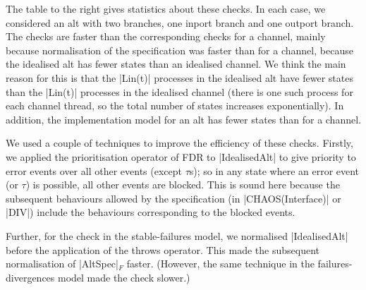 \begin{window}
%
The table to the right gives statistics about these checks.  In each case, we
considered an alt with two branches, one inport branch and one outport
branch.  The checks are faster than the corresponding checks for a channel,
mainly because normalisation of the specification was
faster than for a channel, because the idealised alt has fewer states than an
idealised channel.  We think the main reason for this is that the |Lin(t)|
processes in the idealised alt have fewer states than the |Lin(t)| processes
in the idealised channel (there is one such process for each channel thread,
so the total number of states increases exponentially).  In addition, the
implementation model for an alt has fewer states than for a channel.
\end{window}

We used a couple of techniques to improve the efficiency of these checks.
Firstly, we applied the prioritisation operator of FDR to |IdealisedAlt| to
give priority to error events over all other events (except $\tau$s); so in
any state where an error event (or $\tau$) is possible, all other events are
blocked.  This is sound here because the subsequent behaviours allowed by the
specification (in |CHAOS(Interface)| or |DIV|) include the behaviours
corresponding to the blocked events.

Further, for the check in the stable-failures model, we normalised
|IdealisedAlt| before the application of the throws operator.  This made the
subsequent normalisation of |AltSpec|$_F$ faster.  (However, the same
technique in the failures-divergences model made the check slower.)

